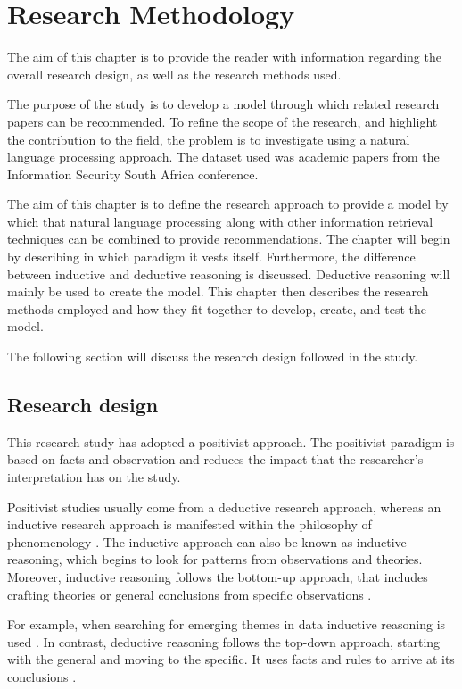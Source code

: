 \chapter{Research Methodology}
\label{chap: Chapter 4}

The aim of this chapter is to provide the reader with information regarding the overall research design, as well as the research methods used.

The purpose of the study is to develop a model through which related research papers can be recommended. To refine the scope of the research, and highlight the contribution to the field, the problem is to investigate using a natural language processing approach. The dataset used was academic papers from the Information Security South Africa conference.

The aim of this chapter is to define the research approach to provide a model by which that natural language processing along with other information retrieval techniques can be combined to provide recommendations. The chapter will begin by describing in which paradigm it vests itself. Furthermore, the difference between inductive and deductive reasoning is discussed. Deductive reasoning will mainly be used to create the model. This chapter then describes the research methods employed and how they fit together to develop, create, and test the model.

The following section will discuss the research design followed in the study.

\section{Research design}

This research study has adopted a positivist approach. The positivist paradigm is based on facts and observation \cite{wilson2014essentials} and reduces the impact that the researcher’s interpretation has on the study.

Positivist studies usually come from a deductive research approach, whereas an inductive research approach is manifested within the philosophy of phenomenology \cite{saunders2007research}. The inductive approach can also be known as inductive reasoning, which begins to look for patterns from observations and theories. Moreover, inductive reasoning follows the bottom-up approach, that includes crafting theories or general conclusions from specific observations \cite{saunders2007research}.

For example, when searching for emerging themes in data inductive reasoning is used \cite{Fereday2006}. In contrast, deductive reasoning follows the top-down approach, starting with the general and moving to the specific. It uses facts and rules to arrive at its conclusions \cite{Fereday2006}.

